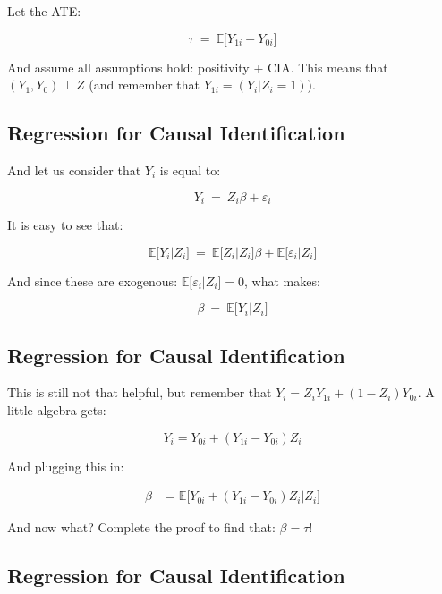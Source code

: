 \documentclass[11pt]{article}
\begin{document}
Let the ATE:

\[ \tau \ = \ \mathbb{E}\big[Y_{1i} - Y_{0i}\big] \]

And assume all assumptions hold: positivity + CIA. This means that
\((Y_1, Y_0) \perp Z\) (and remember that \(Y_{1i} = (Y_i | Z_i = 1)\)).

    \hypertarget{regression-for-causal-identification}{%
\subsection{Regression for Causal
Identification}\label{regression-for-causal-identification}}

And let us consider that \(Y_i\) is equal to:

\[ Y_i \ = \ Z_i \beta + \varepsilon_i \]

It is easy to see that:

\[ \mathbb{E} \big[Y_i | Z_i \big] \ = \ \mathbb{E} \big[Z_i | Z_i\big] \beta + \mathbb{E} \big[\varepsilon_i  | Z_i \big] \]

And since these are exogenous:
\(\mathbb{E} \big[\varepsilon_i | Z_i \big] = 0\), what makes:

\[ \beta \ = \ \mathbb{E} \big[Y_i | Z_i \big] \]

    \hypertarget{regression-for-causal-identification}{%
\subsection{Regression for Causal
Identification}\label{regression-for-causal-identification}}

This is still not that helpful, but remember that
\(Y_i = Z_iY_{1i} + (1 - Z_i)Y_{0i}\). A little algebra gets:

\[ Y_i = Y_{0i} + (Y_{1i} - Y_{0i})Z_i \]

And plugging this in:

\[
\begin{align}
\beta & = \mathbb{E} \big[Y_{0i} + (Y_{1i} - Y_{0i})Z_i | Z_i \big]
\end{align}
\]

And now what? Complete the proof to find that: \(\beta = \tau\)!

    \hypertarget{regression-for-causal-identification}{%
\subsection{Regression for Causal
Identification}\label{regression-for-causal-identification}}
\end{document}

